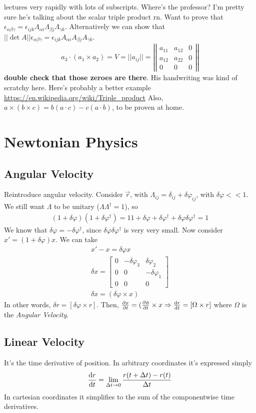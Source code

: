 \documentclass{article} \usepackage{amsmath} \usepackage{amssymb} \usepackage{amsthm} \usepackage[margin=0.2in]{geometry} \usepackage{hyperref} \usepackage{physics} \usepackage{tikz} \usepackage{mathtools} \mathtoolsset{showonlyrefs} \theoremstyle{definition} \newtheorem{theorem}{Theorem}[section] \newtheorem{corollary}{Corollary}[theorem] \newtheorem{lemma}[theorem]{Lemma} \newtheorem{definition}{Definition}[section] \author{Connor Duncan} \date{\today}
\begin{document}
lectures very rapidly with lots of subscripts. Where's the professor? I'm pretty sure he's talking about the scalar triple product rn. Want to prove that $\epsilon_{\alpha\beta\gamma}=\epsilon_{ijk}\Lambda_{\alpha i}\Lambda_{\beta j}\Lambda_{\gamma k}$. Alternatively we can show that $||\det A||\epsilon_{\alpha\beta\gamma}=\epsilon_{ijk}A_{\alpha i}A_{\beta j}A_{\gamma k}$. \begin{align} a_3\cdot(a_1\times a_2)=V=||a_{ij}||=\left|\left|\begin{matrix}a_{11} & a_{12} & 0\\ a_{12} & a_{22} & 0\\0&0&0\end{matrix}\right|\right| \end{align} \textbf{double check that those zeroes are there}. His handwriting was kind of scratchy here. Here's probably a better example \url{https://en.wikipedia.org/wiki/Triple_product} Also, $a\times(b\times c)=b(a\cdot c)-c(a\cdot b)$, to be proven at home. \section{Newtonian Physics} \subsection{Angular Velocity} Reintroduce angular velocity. Consider $\vec{r}$, with $\Lambda_{ij}=\delta_{ij}+\delta\varphi_{ij}$, with $\delta\varphi<<1$. We still want $\Lambda$ to be unitary ($\Lambda\Lambda^\dag=1$), so \begin{align} (1+\delta\varphi)(1+\delta\varphi^\dag)=1 1+\delta\varphi+\delta\varphi^\dag+\delta\varphi\delta\varphi^\dag=1 \end{align} We know that $\delta\varphi=-\delta\varphi^\dag$, since $\delta\varphi\delta\varphi^\dag$ is very very small. Now consider $x'=(1+\delta\varphi)x$. We can take \begin{align} x'-x=\delta\varphi x\\ \delta x= \begin{bmatrix} 0 & -\delta\varphi_3 & \delta\varphi_2\\ 0 & 0 & -\delta\varphi_1\\ 0 & 0 & 0 \end{bmatrix}\\ \delta x=(\delta\varphi\times x) \end{align} In other words, $\delta r=[\delta\varphi\times r]$. Then, $\pdv{x}{t}=(\pdv{\phi}{t}\times x\Rightarrow\dv{r}{t}=[\Omega\times r]$ where $\Omega$ is the \emph{Angular Velocity}. \subsection{Linear Velocity} It's the time derivative of position. In arbitrary coordinates it's expressed simply \begin{align} \dv{r}{t}=\lim_{\Delta t\rightarrow0}\frac{r(t+\Delta t)-r(t)}{\Delta t} \end{align} In cartesian coordinates it simplifies to the sum of the componentwise time derivatives. 
\end{document}
